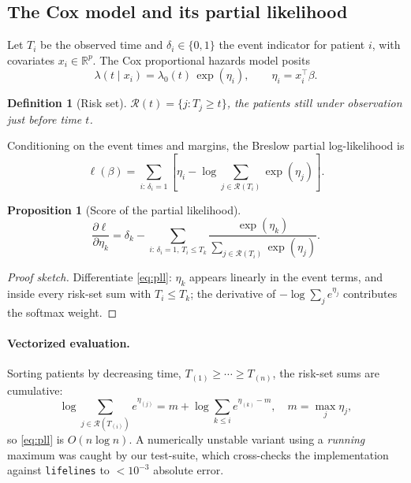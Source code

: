 \documentclass[12pt,a4paper]{article}
\newtheorem{proposition}{Proposition}
\newtheorem{definition}{Definition}
\begin{document}
\subsection{The Cox model and its partial likelihood}
Let $T_i$ be the observed time and $\delta_i \in \{0,1\}$ the event indicator
for patient $i$, with covariates $x_i \in \mathbb{R}^p$. The Cox proportional
hazards model posits
\begin{equation}
  \lambda(t \mid x_i) = \lambda_0(t)\, \exp(\eta_i), \qquad \eta_i = x_i^\top \beta .
\end{equation}
\begin{definition}[Risk set]
$\mathcal{R}(t) = \{ j : T_j \ge t \}$, the patients still under observation
just before time $t$.
\end{definition}
Conditioning on the event times and margins, the Breslow partial
log-likelihood is
\begin{equation}
  \ell(\beta) = \sum_{i:\, \delta_i = 1} \left[ \eta_i
    - \log \sum_{j \in \mathcal{R}(T_i)} \exp(\eta_j) \right]. \label{eq:pll}
\end{equation}
\begin{proposition}[Score of the partial likelihood]
\begin{equation}
  \frac{\partial \ell}{\partial \eta_k}
  = \delta_k - \sum_{i:\,\delta_i=1,\, T_i \le T_k}
    \frac{\exp(\eta_k)}{\sum_{j \in \mathcal{R}(T_i)} \exp(\eta_j)} .
\end{equation}
\end{proposition}
\begin{proof}[Proof sketch]
Differentiate \eqref{eq:pll}: $\eta_k$ appears linearly in the event terms,
and inside every risk-set sum with $T_i \le T_k$; the derivative of
$-\log\sum_j e^{\eta_j}$ contributes the softmax weight.
\end{proof}
\paragraph{Vectorized evaluation.}
Sorting patients by decreasing time, $T_{(1)} \ge \cdots \ge T_{(n)}$, the
risk-set sums are cumulative:
\begin{equation}
  \log \sum_{j \in \mathcal{R}(T_{(i)})} e^{\eta_{(j)}}
  = m + \log \sum_{k \le i} e^{\eta_{(k)} - m}, \quad m = \max_j \eta_j ,
\end{equation}
so \eqref{eq:pll} is $O(n \log n)$. A numerically unstable variant using a
\emph{running} maximum was caught by our test-suite, which cross-checks the
implementation against \texttt{lifelines} to $<10^{-3}$ absolute error.
\end{document}
